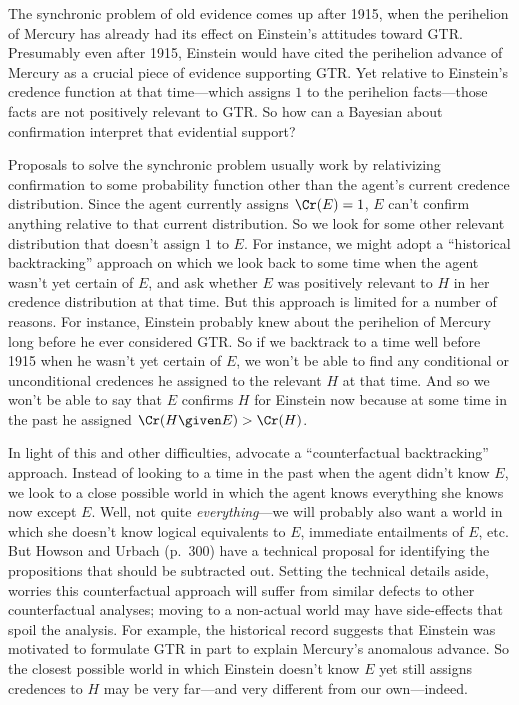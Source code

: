 The synchronic problem of old evidence comes up after 1915, when the perihelion of Mercury has already had its effect on Einstein's attitudes toward GTR. Presumably even after 1915, Einstein would have cited the perihelion advance of Mercury as a crucial piece of evidence supporting GTR. Yet relative to Einstein's credence function at that time---which assigns $1$ to the perihelion facts---those facts are not positively relevant to GTR. So how can a Bayesian about confirmation interpret that evidential support?

Proposals to solve the synchronic problem usually work by relativizing confirmation to some probability function other than the agent's current credence distribution. Since the agent currently assigns $\Cr(E)=1$, $E$ can't confirm anything relative to that current distribution. So we look for some other relevant distribution that doesn't assign $1$ to $E$. For instance, we might adopt a ``historical backtracking'' approach on which we look back to some time when the agent wasn't yet certain of $E$, and ask whether $E$ was positively relevant to $H$ in her credence distribution at that time. But this approach is limited for a number of reasons. For instance, Einstein probably knew about the perihelion of Mercury long before he ever considered GTR. So if we backtrack to a time well before 1915 when he wasn't yet certain of $E$, we won't be able to find any conditional or unconditional credences he assigned to the relevant $H$ at that time. And so we won't be able to say that $E$ confirms $H$ for Einstein now because at some time in the past he assigned $\Cr(H \given E)>\Cr(H)$.

In light of this and other difficulties, \citet{HowsonUrbach} advocate a ``counterfactual backtracking'' approach. Instead of looking to a time in the past when the agent didn't know $E$, we look to a close possible world in which the agent knows everything she knows now except $E$. Well, not quite \emph{everything}---we will probably also want a world in which she doesn't know logical equivalents to $E$, immediate entailments of $E$, etc. But Howson and Urbach (p.\ 300) have a technical proposal for identifying the propositions that should be subtracted out. Setting the technical details aside, \citet[p.\ 123]{EarmanBayes} worries this counterfactual approach will suffer from similar defects to other counterfactual analyses; moving to a non-actual world may have side-effects that spoil the analysis. For example, the historical record suggests that Einstein was motivated to formulate GTR in part to explain Mercury's anomalous advance. So the closest possible world in which Einstein doesn't know $E$ yet still assigns credences to $H$ may be very far---and very different from our own---indeed.

